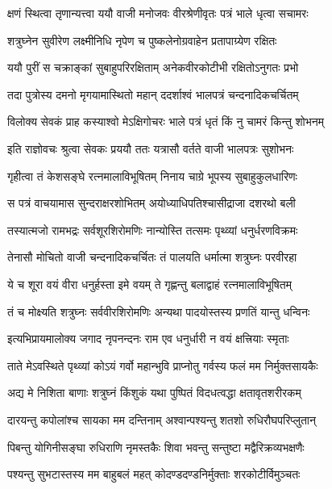 \resetShloka


\twolineshloka
{क्षणं स्थित्वा तृणान्यत्त्वा ययौ वाजी मनोजवः}
{वीरश्रेणीवृतः पत्रं भाले धृत्वा सचामरः}%

\twolineshloka
{शत्रुघ्नेन सुवीरेण लक्ष्मीनिधि नृपेण च}
{पुष्कलेनोग्रवाहेन प्रतापाग्र्येण रक्षितः}%

\twolineshloka
{ययौ पुरीं स चक्राङ्कां सुबाहुपरिरक्षिताम्}
{अनेकवीरकोटीभी रक्षितोऽनुगतः प्रभो}%

\twolineshloka
{तदा पुत्रोस्य दमनो मृगयामास्थितो महान्}
{ददर्शाश्वं भालपत्रं चन्दनादिकचर्चितम्}%

\twolineshloka
{विलोक्य सेवकं प्राह कस्याश्वो मेऽक्षिगोचरः}
{भाले पत्रं धृतं किं नु चामरं किन्तु शोभनम्}%

\twolineshloka
{इति राज्ञोवचः श्रुत्वा सेवकः प्रययौ ततः}
{यत्रासौ वर्तते वाजी भालपत्रः सुशोभनः}%

\twolineshloka
{गृहीत्वा तं केशसङ्घे रत्नमालाविभूषितम्}
{निनाय चाग्रे भूपस्य सुबाहुकुलधारिणः}%

\twolineshloka
{स पत्रं वाचयामास सुन्दराक्षरशोभितम्}
{अयोध्याधिपतिश्चासीद्राजा दशरथो बली}%

\twolineshloka
{तस्यात्मजो रामभद्रः सर्वशूरशिरोमणिः}
{नान्योस्ति तत्समः पृथ्व्यां धनुर्धरणविक्रमः}%

\twolineshloka
{तेनासौ मोचितो वाजी चन्दनादिकचर्चितः}
{तं पालयति धर्मात्मा शत्रुघ्नः परवीरहा}%

\twolineshloka
{ये च शूरा वयं वीरा धनुर्हस्ता इमे वयम्}
{ते गृह्णन्तु बलाद्वाहं रत्नमालाविभूषितम्}%

\twolineshloka
{तं च मोक्ष्यति शत्रुघ्नः सर्ववीरशिरोमणिः}
{अन्यथा पादयोस्तस्य प्रणतिं यान्तु धन्विनः}%

\twolineshloka
{इत्यभिप्रायमालोक्य जगाद नृपनन्दनः}
{राम एव धनुर्धारी न वयं क्षत्त्रियाः स्मृताः}%

\twolineshloka
{ताते मेऽवस्थिते पृथ्व्यां कोऽयं गर्वो महान्भुवि}
{प्राप्नोतु गर्वस्य फलं मम निर्मुक्तसायकैः}%

\twolineshloka
{अद्य मे निशिता बाणाः शत्रुघ्नं किंशुकं यथा}
{पुष्पितं विदधत्वद्धा क्षतावृतशरीरकम्}%

\twolineshloka
{दारयन्तु कपोलांश्च सायका मम दन्तिनाम्}
{अश्वान्पश्यन्तु शतशो रुधिरौघपरिप्लुतान्}%

\twolineshloka
{पिबन्तु योगिनीसङ्घा रुधिराणि नृमस्तकैः}
{शिवा भवन्तु सन्तुष्टा मद्वैरिक्रव्यभक्षणैः}%

\twolineshloka
{पश्यन्तु सुभटास्तस्य मम बाहुबलं महत्}
{कोदण्डदण्डनिर्मुक्ताः शरकोटीर्विमुञ्चतः}%

